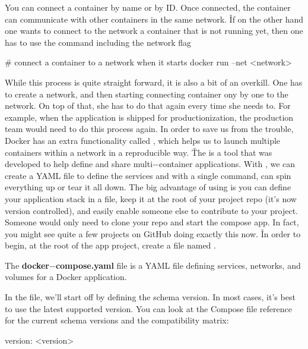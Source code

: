 You can connect a container by name or by ID. Once connected, the container can communicate with other containers in
the same network. \v

If on the other hand one wants to connect to the network a container that is not running yet, then one has to use the
 command including the network  flag

\begin{bash}
# connect a container to a network when it starts
docker run --net <network>
\end{bash}

While this process is quite straight forward, it is also a bit of an overkill. One has to create a network, and then
starting connecting container ony by one to the network. On top of that, she has to do that again every time she
needs to. For example, when the application is shipped for productionization, the production team would need to do
this process again. In order to save us from the trouble, Docker has an extra functionality called , which helps us to launch multiple containers within a network in a reproducible way. \v

The  is a tool that was developed to help define and share multi$-$container applications. With
, we can create a YAML file to define the services and with a single command, can spin
everything up or tear it all down. The big advantage of using  is you can define your
application stack in a file, keep it at the root of your project repo (it's now version controlled), and easily
enable someone else to contribute to your project. Someone would only need to clone your repo and start the compose
app. In fact, you might see quite a few projects on GitHub doing exactly this now. \v

In order to begin, at the root of the app project, create a file named .

The \textbf{docker$-$compose.yaml} file is a YAML file defining services, networks, and volumes for a Docker application.
\ed

In the  file, we'll start off by defining the schema version. In most cases, it's best to
use the latest supported version. You can look at the Compose file reference for the current schema versions and the
compatibility matrix:

\begin{block}
version: <version>
\end{block}


